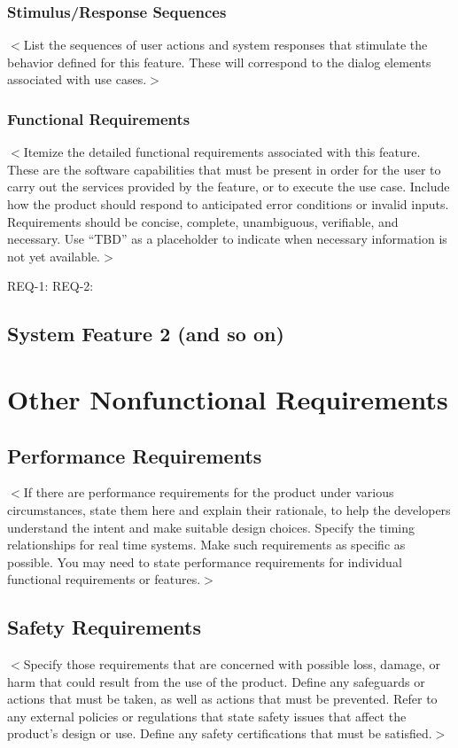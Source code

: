 \documentclass{scrreprt}
\begin{document}
\subsection{Stimulus/Response Sequences}
$<$List the sequences of user actions and system responses that stimulate the 
behavior defined for this feature. These will correspond to the dialog elements 
associated with use cases.$>$

\subsection{Functional Requirements}
$<$Itemize the detailed functional requirements associated with this feature.  
These are the software capabilities that must be present in order for the user 
to carry out the services provided by the feature, or to execute the use case.  
Include how the product should respond to anticipated error conditions or 
invalid inputs. Requirements should be concise, complete, unambiguous, 
verifiable, and necessary. Use “TBD” as a placeholder to indicate when necessary 
information is not yet available.$>$


REQ-1:	REQ-2:

\section{System Feature 2 (and so on)}


\chapter{Other Nonfunctional Requirements}

\section{Performance Requirements}
$<$If there are performance requirements for the product under various 
circumstances, state them here and explain their rationale, to help the 
developers understand the intent and make suitable design choices. Specify the 
timing relationships for real time systems. Make such requirements as specific 
as possible. You may need to state performance requirements for individual 
functional requirements or features.$>$

\section{Safety Requirements}
$<$Specify those requirements that are concerned with possible loss, damage, or 
harm that could result from the use of the product. Define any safeguards or 
actions that must be taken, as well as actions that must be prevented. Refer to 
any external policies or regulations that state safety issues that affect the 
product’s design or use. Define any safety certifications that must be 
satisfied.$>$
\end{document}
